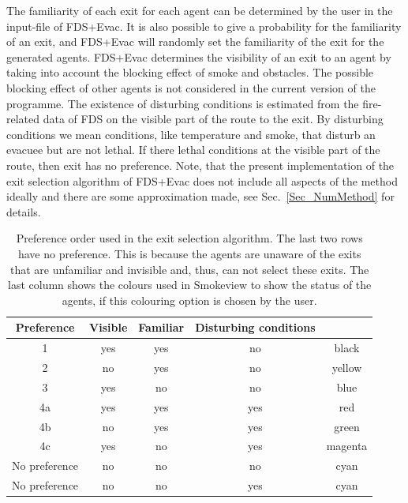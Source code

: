 \documentclass[12pt,a4paper,final,twoside]{stylevk}
\begin{document}
The familiarity of each exit for each agent can be determined by the
user in the input-file of FDS+Evac.  It is also possible to give a
probability for the familiarity of an exit, and FDS+Evac will randomly
set the familiarity of the exit for the generated agents.  FDS+Evac
determines the visibility of an exit to an agent by taking into
account the blocking effect of smoke and obstacles.  The possible
blocking effect of other agents is not considered in the current
version of the programme.  The existence of disturbing conditions is
estimated from the fire-related data of FDS on the visible part of the
route to the exit.  By disturbing conditions we mean conditions, like
temperature and smoke, that disturb an evacuee but are not lethal.  If
there lethal conditions at the visible part of the route, then exit
has no preference.  Note, that the present implementation of the exit
selection algorithm of FDS+Evac does not include all aspects of the
method ideally and there are some approximation made, see
Sec.~\ref{Sec_NumMethod} for details.


%
\begin{table}[!b]
\begin{center}
\caption{Preference order used in the exit selection algorithm.  The 
last two rows have no preference.  This is because the agents are
unaware of the exits that are unfamiliar and invisible and, thus,
can not select these exits.  The last column shows the colours used in
Smokeview to show the status of the agents, if this colouring option
is chosen by the user.}\label{Table_pref_order}
\vspace{12pt}
\begin{tabular}{c|c|c|c|c} \hline \hline
Preference&Visible&Familiar&Disturbing conditions\\ \hline 
1&yes&yes&no&black\\ \hline
2&no&yes&no&yellow\\ \hline 
3&yes&no&no&blue\\ \hline 
4a&yes&yes&yes&red\\ \hline 
4b&no&yes&yes&green\\ \hline 
4c&yes&no&yes&magenta\\ \hline 
No preference&no&no&no&cyan\\ \hline 
No preference&no&no&yes&cyan\\ \hline \hline
\end{tabular}
\end{center}
\end{table}
%
\end{document}
